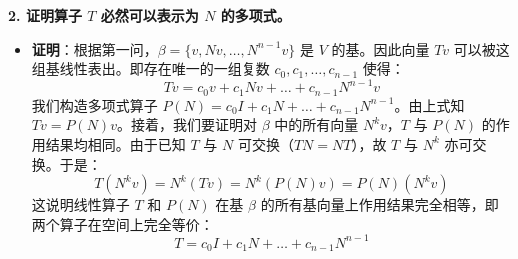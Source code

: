 \documentclass[12pt,a4paper]{article}
\begin{document}
\textbf{2. 证明算子 $T$ 必然可以表示为 $N$ 的多项式。}
\begin{itemize}
    \item \textbf{证明}：根据第一问，$\beta = \{v, Nv, \dots, N^{n-1}v\}$ 是 $V$ 的基。因此向量 $Tv$ 可以被这组基线性表出。即存在唯一的一组复数 $c_0, c_1, \dots, c_{n-1}$ 使得：
    $$ Tv = c_0v + c_1Nv + \dots + c_{n-1}N^{n-1}v $$
    我们构造多项式算子 $P(N) = c_0I + c_1N + \dots + c_{n-1}N^{n-1}$。由上式知 $Tv = P(N)v$。接着，我们要证明对 $\beta$ 中的所有向量 $N^kv$，$T$ 与 $P(N)$ 的作用结果均相同。由于已知 $T$ 与 $N$ 可交换（$TN = NT$），故 $T$ 与 $N^k$ 亦可交换。于是：
    $$ T(N^k v) = N^k(Tv) = N^k(P(N)v) = P(N)(N^k v) $$
    这说明线性算子 $T$ 和 $P(N)$ 在基 $\beta$ 的所有基向量上作用结果完全相等，即两个算子在空间上完全等价：
    $$ T = c_0I + c_1N + \dots + c_{n-1}N^{n-1} $$
\end{itemize}
\end{document}

